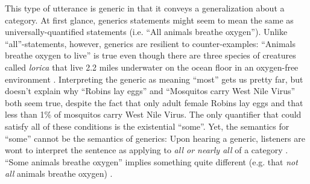 \documentclass[10pt,letterpaper]{article}
\begin{document}
This type of utterance is generic \cite{Carlson1977, Leslie2008} in that it conveys a generalization about a category. At first glance, generics statements might seem to mean the same as universally-quantified statements (i.e. ``All animals breathe oxygen''). Unlike ``all''-statements, however, generics are resilient to counter-examples: ``Animals breathe oxygen to live'' is true even though there are three species of creatures called \emph{lorica} that live 2.2 miles underwater on the ocean floor in an oxygen-free environment \cite{Danovaro2010}. Interpreting the generic as meaning ``most'' gets us pretty far, but doesn't explain why ``Robins lay eggs'' and ``Mosquitos carry West Nile Virus'' both seem true, despite the fact that only adult female Robins lay eggs and that less than 1\% of mosquitos carry West Nile Virus. The only quantifier that could satisfy all of these conditions is the existential ``some''.  Yet, the semantics for ``some'' cannot be the semantics of generics:  Upon hearing a generic, listeners are wont to interpret the sentence as applying to \emph{all or nearly all} of a category \cite{Gelman2002, Cimpian2010}. ``Some animals breathe oxygen'' implies something quite different (e.g. that \emph{not all} animals breathe oxygen) \cite{Degen2015}.

%
\end{document}
